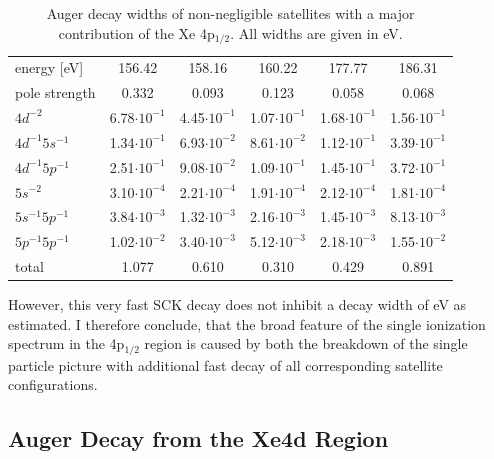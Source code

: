 \begin{table}[h]
 \centering
 \caption{Auger decay widths of non-negligible satellites with a major
          contribution of the Xe 4p$_{1/2}$. All widths are given in \unit{eV}.}
 \begin{tabular}{lccccc}
   \toprule
   energy [\unit{eV}] & 156.42  & 158.16 & 160.22 & 177.77 & 186.31\\
   pole strength       &   0.332 &   0.093&   0.123&   0.058&   0.068\\
   \midrule
   $4d^{-2}$          & 6.78$\cdot10^{-1}$ & 4.45$\cdot10^{-1}$ & 1.07$\cdot10^{-1}$ & 1.68$\cdot10^{-1}$ & 1.56$\cdot10^{-1}$\\
   $4d^{-1}5s^{-1}$   & 1.34$\cdot10^{-1}$ & 6.93$\cdot10^{-2}$ & 8.61$\cdot10^{-2}$ & 1.12$\cdot10^{-1}$ & 3.39$\cdot10^{-1}$\\
   $4d^{-1}5p^{-1}$   & 2.51$\cdot10^{-1}$ & 9.08$\cdot10^{-2}$ & 1.09$\cdot10^{-1}$ & 1.45$\cdot10^{-1}$ & 3.72$\cdot10^{-1}$\\
   $5s^{-2}$          & 3.10$\cdot10^{-4}$ & 2.21$\cdot10^{-4}$ & 1.91$\cdot10^{-4}$ & 2.12$\cdot10^{-4}$ & 1.81$\cdot10^{-4}$\\
   $5s^{-1}5p^{-1}$   & 3.84$\cdot10^{-3}$ & 1.32$\cdot10^{-3}$ & 2.16$\cdot10^{-3}$ & 1.45$\cdot10^{-3}$ & 8.13$\cdot10^{-3}$\\
   $5p^{-1}5p^{-1}$   & 1.02$\cdot10^{-2}$ & 3.40$\cdot10^{-3}$ & 5.12$\cdot10^{-3}$ & 2.18$\cdot10^{-3}$ & 1.55$\cdot10^{-2}$\\
   \midrule
   total              &   1.077 &   0.610&   0.310&   0.429&   0.891\\
   \bottomrule
 \end{tabular}
 \label{table:xe_auger_rel11}
\end{table}

However, this very fast \ac{SCK} decay does not inhibit a decay width of
\unit[10--100]{eV} as estimated\cite{}. I therefore conclude, that the broad
feature of the single ionization spectrum in the 4p$_{1/2}$ region is caused
by both the breakdown of the single particle picture with additional fast decay
of all corresponding satellite configurations.


\subsection{Auger Decay from the Xe4d Region}


